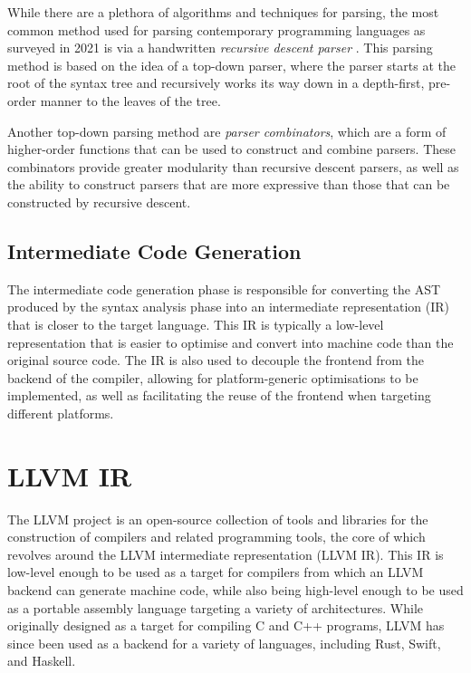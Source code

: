While there are a plethora of algorithms and techniques for parsing, the most common method used for
parsing contemporary programming languages as surveyed in 2021 is via a handwritten \emph{recursive
    descent parser} \autocite{eaton2021parser}. This parsing method is based on the idea of a top-down
parser, where the parser starts at the root of the syntax tree and recursively works its way down in
a depth-first, pre-order manner to the leaves of the tree.

Another top-down parsing method are \emph{parser combinators}, which are a form of higher-order
functions that can be used to construct and combine parsers. These combinators provide greater
modularity than recursive descent parsers, as well as the ability to construct parsers that are more
expressive than those that can be constructed by recursive descent.

\subsection{Intermediate Code Generation}

The intermediate code generation phase is responsible for converting the AST produced by the syntax
analysis phase into an intermediate representation (IR) that is closer to the target language. This
IR is typically a low-level representation that is easier to optimise and convert into machine code
than the original source code. The IR is also used to decouple the frontend from the backend of the
compiler, allowing for platform-generic optimisations to be implemented, as well as facilitating the
reuse of the frontend when targeting different platforms.

\section{LLVM IR}

The LLVM project is an open-source collection of tools and libraries for the construction of
compilers and related programming tools, the core of which revolves around the LLVM intermediate
representation (LLVM IR). This IR is low-level enough to be used as a target for compilers from
which an LLVM backend can generate machine code, while also being high-level enough to be used as a
portable assembly language targeting a variety of architectures. While originally designed as a
target for compiling C and C++ programs, LLVM has since been used as a backend for a variety of
languages, including Rust, Swift, and Haskell.

